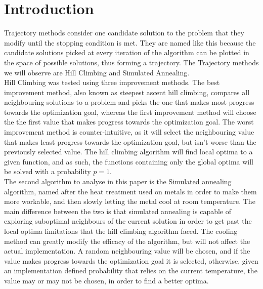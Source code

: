 \documentclass{article}
\begin{document}
\section{Introduction}
Trajectory methods consider one candidate solution to the problem that they modify until the stopping condition is met. They are named like this because the candidate solutions picked at every iteration of the algorithm can be plotted in the space of possible solutions, thus forming a trajectory. The Trajectory methods we will observe are Hill Climbing and Simulated Annealing. \\
Hill Climbing was tested using three improvement methods. The best improvement method, also known as steepest ascent hill climbing, compares all neighbouring solutions to a problem and picks the one that makes most progress towards the optimization goal, whereas the first improvement method will choose the the first value that makes progress towards the optimization goal. The worst improvement method is counter-intuitive, as it will select the neighbouring value that makes least progress towards the optimization goal, but isn't worse than the previously selected value. The hill climbing algorithm will find local optima to a given function, and as such, the functions containing only the global optima will be solved with a probability $p=1$. \\
The second algorithm to analyse in this paper is the \underline{\href{https://en.wikipedia.org/wiki/Simulated_annealing}{Simulated annealing}}\cite{SA} algorithm, named after the heat treatment used on metals in order to make them more workable, and then slowly letting the metal cool at room temperature. The main difference between the two is that simulated annealing is capable of exploring suboptimal neighbours of the current solution in order to get past the local optima limitations that the hill climbing algorithm faced. The cooling method can greatly modify the efficacy of the algorithm, but will not affect the actual implementation. A random neighbouring value will be chosen, and if the value makes progress towards the optimization goal it is selected, otherwise, given an implementation defined probability that relies on the current temperature, the value may or may not be chosen, in order to find a better optima.\\
\end{document}
